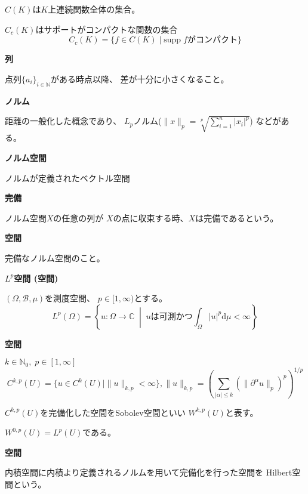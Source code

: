 \documentclass[12pt,b5paper]{ltjsarticle}
\begin{document}
\hrulefill

$C(K)$は$K$上連続関数全体の集合。

$C_{c}(K)$はサポートがコンパクトな関数の集合
\begin{equation}
 C_{c}(K) = \{f\in C(K) \mid \mathrm{supp}\;f がコンパクト\}
\end{equation}

\textbf{列}

点列$\{a_{i}\}_{i\in\mathbb{N}}$がある時点以降、
差が十分に小さくなること。

\textbf{ノルム}

距離の一般化した概念であり、
$L_{p}$ノルム($\| x \|_{p}=\sqrt[p]{\sum_{i=1}^{n}|x_{i}|^{p}}$)
などがある。

\textbf{ノルム空間}

ノルムが定義されたベクトル空間


\textbf{完備}

ノルム空間$X$の任意の列が
$X$の点に収束する時、$X$は完備であるという。

\textbf{空間}

完備なノルム空間のこと。

\textbf{$L^{p}$空間 (空間)}

$(\Omega,\mathcal{B},\mu)$を測度空間、
$p\in [1,\infty)$とする。
\begin{equation}
 L^{p}(\Omega) =
  \left\{
   u:\Omega\to\mathbb{C} \; \middle| \; uは可測かつ \int_{\Omega} \lvert u \rvert^{p}\mathrm{d}\mu < \infty
  \right\}
\end{equation}



\textbf{空間}

$k\in\mathbb{N}_{0}, \; p\in [1,\infty]$
\begin{equation}
 C^{k,p}(U) = \{ u\in C^{k}(U) \mid \|u\|_{k,p} < \infty\}
  , \|u\|_{k,p} = \left(\sum_{\lvert \alpha \rvert \leq k} (\|\partial^{\alpha}u\|_{p})^{p}\right)^{1/p}
\end{equation}

$C^{k,p}(U)$を完備化した空間をSobolev空間といい
$W^{k,p}(U)$と表す。

$W^{0,p}(U)=L^{p}(U)$である。



\textbf{空間}

内積空間に内積より定義されるノルムを用いて完備化を行った空間を
Hilbert空間という。
\end{document}
